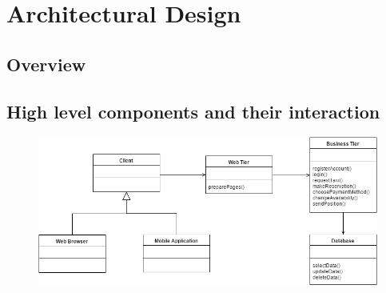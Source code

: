 

%

\newpage
	\section{Architectural Design}
		\subsection{Overview}
				
\newpage
		\subsection{High level components and their interaction}
			\vspace{1cm}
			\begin{figure}[h]
				\centering
				\includegraphics[scale=0.45]{HighLevelComp.png}
			\end{figure}
			\vspace{1cm}
